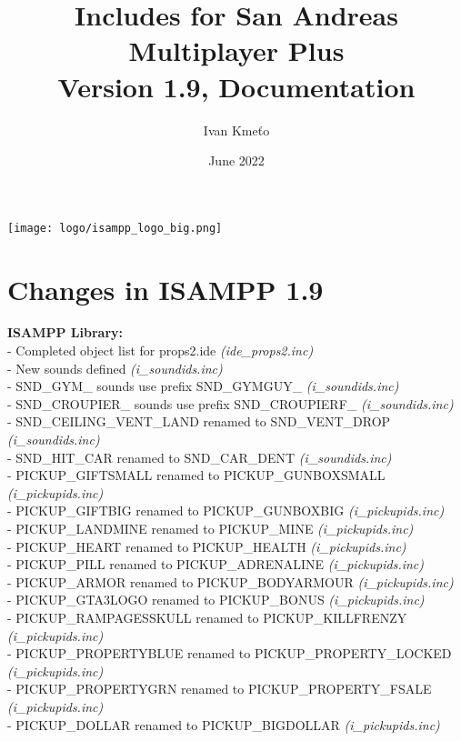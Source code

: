 \documentclass{article}
\title{Includes for San Andreas Multiplayer Plus\\Version 1.9, Documentation}
\author{Ivan Kmeťo}
\date{June 2022}
\begin{document}
\maketitle
\begin{center}
\texttt{[image: logo/isampp\_logo\_big.png]}
\end{center}

\newpage
\tableofcontents

\newpage
\section{Changes in ISAMPP 1.9}
\textbf{ISAMPP Library:}
\\- Completed object list for props2.ide \textit{(ide\_props2.inc)}
\\- New sounds defined \textit{(i\_soundids.inc)}
\\- SND\_GYM\_ sounds use prefix SND\_GYMGUY\_ \textit{(i\_soundids.inc)}
\\- SND\_CROUPIER\_ sounds use prefix SND\_CROUPIERF\_ \textit{(i\_soundids.inc)}
\\- SND\_CEILING\_VENT\_LAND renamed to SND\_VENT\_DROP \textit{(i\_soundids.inc)}
\\- SND\_HIT\_CAR renamed to SND\_CAR\_DENT \textit{(i\_soundids.inc)}
\\- PICKUP\_GIFTSMALL renamed to PICKUP\_GUNBOXSMALL \textit{(i\_pickupids.inc)}
\\- PICKUP\_GIFTBIG renamed to PICKUP\_GUNBOXBIG \textit{(i\_pickupids.inc)}
\\- PICKUP\_LANDMINE renamed to PICKUP\_MINE \textit{(i\_pickupids.inc)}
\\- PICKUP\_HEART renamed to PICKUP\_HEALTH \textit{(i\_pickupids.inc)}
\\- PICKUP\_PILL renamed to PICKUP\_ADRENALINE \textit{(i\_pickupids.inc)}
\\- PICKUP\_ARMOR renamed to PICKUP\_BODYARMOUR \textit{(i\_pickupids.inc)}
\\- PICKUP\_GTA3LOGO renamed to PICKUP\_BONUS \textit{(i\_pickupids.inc)}
\\- PICKUP\_RAMPAGESSKULL renamed to PICKUP\_KILLFRENZY \textit{(i\_pickupids.inc)}
\\- PICKUP\_PROPERTYBLUE renamed to PICKUP\_PROPERTY\_LOCKED \textit{(i\_pickupids.inc)}
\\- PICKUP\_PROPERTYGRN renamed to PICKUP\_PROPERTY\_FSALE \textit{(i\_pickupids.inc)}
\\- PICKUP\_DOLLAR renamed to PICKUP\_BIGDOLLAR \textit{(i\_pickupids.inc)}
\end{document}
